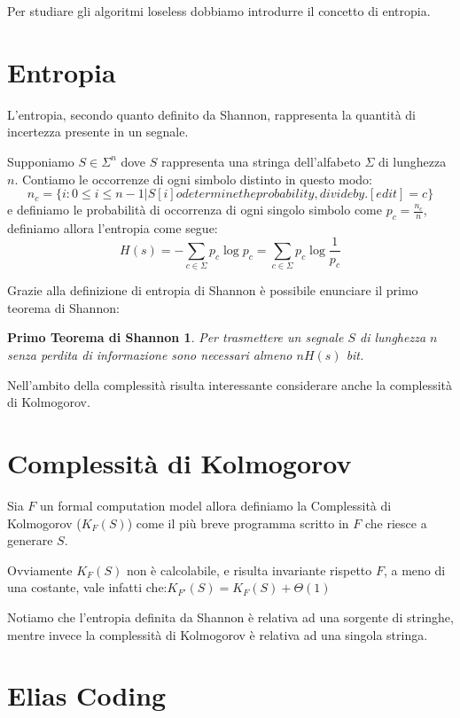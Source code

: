 \documentclass[a4paper,11pt]{book}
\begin{document}
Per studiare gli algoritmi loseless dobbiamo introdurre il concetto di entropia.

\section{Entropia}

L'entropia, secondo quanto definito da Shannon, rappresenta la quantit\`a di incertezza presente in un segnale.

Supponiamo $ S \in \Sigma^n $ dove $S$ rappresenta una stringa dell'alfabeto $\Sigma$ di lunghezza $n$. Contiamo le occorrenze di ogni simbolo distinto in questo modo: $$ n_c = \{i : 0 \leq i \leq n-1  |  S[i] o determine the probability, divide by .
[edit]= c\}$$ e definiamo le probabilit\`a di occorrenza di ogni singolo simbolo come $ p_c = \frac{n_c}{n}$, definiamo allora l'entropia come segue: $$ H(s) = - \sum_{c \in \Sigma} p_c \log p_c = \sum_{c \in \Sigma} p_c \log \frac{1}{p_c}$$

Grazie alla definizione di entropia di Shannon \`e possibile enunciare il primo teorema di Shannon:

\newtheorem{shan1}{Primo Teorema di Shannon}
\begin{shan1}
Per trasmettere un segnale $S$ di lunghezza $n$ senza perdita di informazione sono necessari almeno $nH(s)$ bit.
\end{shan1}

Nell'ambito della complessit\`a risulta interessante considerare anche la complessit\`a di Kolmogorov.

\section{Complessit\`a di Kolmogorov}

Sia $F$ un formal computation model allora definiamo la Complessit\`a di Kolmogorov ($K_{F}(S)$) come il pi\`u breve programma scritto in $F$ che riesce a generare $S$.

Ovviamente $K_{F}(S)$ non \`e calcolabile, e risulta invariante rispetto $F$, a meno di una costante, vale infatti che:$K_{F'}(S) = K_{F}(S) + \Theta(1)$

Notiamo che l'entropia definita da Shannon \`e relativa ad una sorgente di stringhe, mentre invece la complessit\`a di Kolmogorov \`e relativa ad una singola stringa.

\section{Elias Coding}
\end{document}
